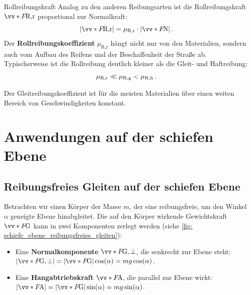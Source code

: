 \begin{rememberbox}[]{Rollreibungskraft}
Analog zu den anderen Reibungsarten ist die Rollreibungskraft $\ivecS{F}{\text{R,r}}$ proportional zur Normalkraft:
\begin{equation}\label{eq: rollreibungskraft}
    |\ivecS{F}{\text{R,r}}| = \mu_{\text{R,r}} \cdot |\ivecS{F}{\text{N}}| \mDot
\end{equation}
Der \textbf{Rollreibungskoeffizient} $\mu_{\text{R,r}}$ hängt nicht nur von den Materialien, sondern auch vom Aufbau des Reifens und der Beschaffenheit der Straße ab. Typischerweise ist die Rollreibung deutlich kleiner als die Gleit- und Haftreibung:
\begin{equation}
    \mu_{\text{R,r}} \ll \mu_{\text{R,g}} < \mu_{\text{R,h}}\,.
\end{equation}
\end{rememberbox}
Der Gleitreibungskoeffizient ist für die meisten Materialien über einen weiten Bereich von Geschwindigkeiten konstant. 
 
\section{Anwendungen auf der schiefen Ebene}\label{sec: schiefe_ebene_beispiele}
\subsection{Reibungsfreies Gleiten auf der schiefen Ebene}\label{subsec: reibungsfreies_gleiten}
Betrachten wir einen Körper der Masse $m$, der eine reibungsfreie, um den Winkel $\alpha$ geneigte Ebene hinabgleitet. Die auf den Körper wirkende Gewichtskraft $\ivecS{F}{\text{G}}$ kann in zwei Komponenten zerlegt werden (siehe \cref{fig: schiefe_ebene_reibungsfreies_gleiten}):
\begin{itemize}[itemsep=1.5pt]
    \item Eine \textbf{Normalkomponente} $\ivecS{F}{\text{G},\perp}$, die senkrecht zur Ebene steht: \newline
    $|\ivecS{F}{\text{G},\perp}| = |\ivecS{F}{\text{G}}| \cos(\alpha) = mg\cos(\alpha)$.
    \item Eine \textbf{Hangabtriebskraft} $\ivecS{F}{\text{A}}$, die parallel zur Ebene wirkt: \newline
    $|\ivecS{F}{\text{A}}| = |\ivecS{F}{\text{G}}| \sin(\alpha) = mg\sin(\alpha)$.
\end{itemize}


